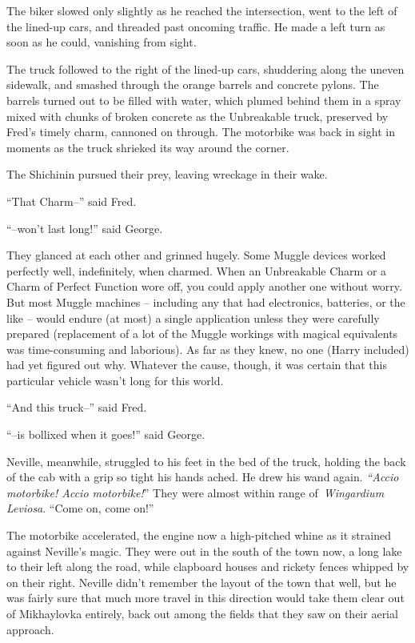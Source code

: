The biker slowed only slightly as he reached the intersection, went to
the left of the lined-up cars, and threaded past oncoming traffic. He
made a left turn as soon as he could, vanishing from sight.

The truck followed to the right of the lined-up cars, shuddering along
the uneven sidewalk, and smashed through the orange barrels and concrete
pylons. The barrels turned out to be filled with water, which plumed
behind them in a spray mixed with chunks of broken concrete as the
Unbreakable truck, preserved by Fred's timely charm, cannoned on
through. The motorbike was back in sight in moments as the truck
shrieked its way around the corner.

The Shichinin pursued their prey, leaving wreckage in their wake.

``That Charm--'' said Fred.

``--won't last long!'' said George.

They glanced at each other and grinned hugely. Some Muggle devices
worked perfectly well, indefinitely, when charmed. When an Unbreakable
Charm or a Charm of Perfect Function wore off, you could apply another
one without worry. But most Muggle machines -- including any that had
electronics, batteries, or the like -- would endure (at most) a single
application unless they were carefully prepared (replacement of a lot of
the Muggle workings with magical equivalents was time-consuming and
laborious). As far as they knew, no one (Harry included) had yet figured
out why. Whatever the cause, though, it was certain that this particular
vehicle wasn't long for this world.

``And this truck--'' said Fred.

``--is bollixed when it goes!'' said George.

Neville, meanwhile, struggled to his feet in the bed of the truck,
holding the back of the cab with a grip so tight his hands ached. He
drew his wand again. \emph{``Accio motorbike! Accio motorbike!}'' They
were almost within range of~\emph{Wingardium Leviosa}. ``Come on, come
on!''

The motorbike accelerated, the engine now a high-pitched whine as it
strained against Neville's magic. They were out in the south of the town
now, a long lake to their left along the road, while clapboard houses
and rickety fences whipped by on their right. Neville didn't remember
the layout of the town that well, but he was fairly sure that much more
travel in this direction would take them clear out of Mikhaylovka
entirely, back out among the fields that they saw on their aerial
approach.\\

